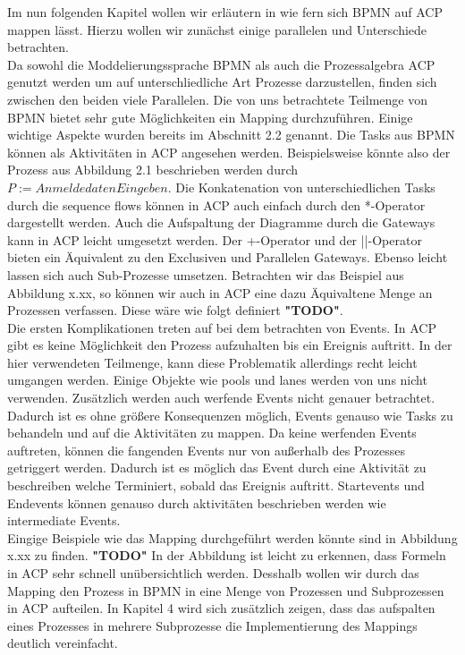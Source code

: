 Im nun folgenden Kapitel wollen wir erläutern in wie fern sich BPMN auf ACP mappen lässt. Hierzu wollen wir zunächst einige parallelen und Unterschiede betrachten. \\
Da sowohl die Moddelierungssprache BPMN als auch die Prozessalgebra ACP genutzt werden um auf unterschliedliche Art Prozesse darzustellen, finden sich zwischen den beiden viele Parallelen. Die von uns betrachtete Teilmenge von BPMN bietet sehr gute Möglichkeiten ein Mapping durchzuführen. Einige wichtige Aspekte wurden bereits im Abschnitt 2.2 genannt. Die Tasks aus BPMN können als Aktivitäten in ACP angesehen werden. Beispielsweise könnte also der Prozess aus Abbildung 2.1 beschrieben werden durch $P:=AnmeldedatenEingeben.$ Die Konkatenation von unterschiedlichen Tasks durch die sequence flows können in ACP auch einfach durch den *-Operator dargestellt werden. Auch die Aufspaltung der Diagramme durch die Gateways kann in ACP leicht umgesetzt werden. Der +-Operator und der ||-Operator bieten ein Äquivalent zu den Exclusiven und Parallelen Gateways. Ebenso leicht lassen sich auch Sub-Prozesse umsetzen. Betrachten wir das Beispiel aus Abbildung x.xx, so können wir auch in ACP eine dazu Äquivaltene Menge an Prozessen verfassen. Diese wäre wie folgt definiert \textbf{"TODO"}.\\
Die ersten Komplikationen treten auf bei dem betrachten von Events. In ACP gibt es keine Möglichkeit den Prozess aufzuhalten bis ein Ereignis auftritt. In der hier verwendeten Teilmenge, kann diese Problematik allerdings recht leicht umgangen werden. Einige Objekte wie pools und lanes werden von uns nicht verwenden. Zusätzlich werden auch werfende Events nicht genauer betrachtet. Dadurch ist es ohne größere Konsequenzen möglich, Events genauso wie Tasks zu behandeln und auf die Aktivitäten zu mappen. Da keine werfenden Events auftreten, können die fangenden Events nur von außerhalb des Prozesses getriggert werden. Dadurch ist es möglich das Event durch eine Aktivität zu beschreiben welche Terminiert, sobald das Ereignis auftritt. Startevents und Endevents können genauso durch aktivitäten beschrieben werden wie intermediate Events. \\
Eingige Beispiele wie das Mapping durchgeführt werden könnte sind in Abbildung x.xx zu finden. \textbf{"TODO"}
In der Abbildung ist leicht zu erkennen, dass Formeln in ACP sehr schnell unübersichtlich werden. Desshalb wollen wir durch das Mapping den Prozess in BPMN in eine Menge von Prozessen und Subprozessen in ACP aufteilen. In Kapitel 4 wird sich zusätzlich zeigen, dass das aufspalten eines Prozesses in mehrere Subprozesse die Implementierung des Mappings deutlich vereinfacht.\\
